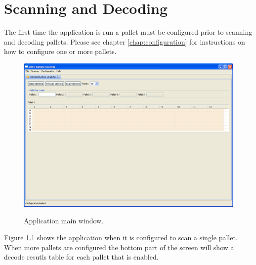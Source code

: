 \chapter{Scanning and Decoding}

The first time the application is run a pallet must be configured prior to
scanning and decoding pallets. Please see chapter \ref{chap:configuration} for
instructions on how to configure one or more pallets.
\begin{figure}[H]
  \centering
  \scalebox{0.35}
	   { \includegraphics*{screenshots/scan_and_decode/main_window} }
	   \caption{Application main window.}
	   \label{fig:main_window_2}
\end{figure}
Figure \ref{fig:main_window_2} shows the application when it is configured to
scan a single pallet. When more pallets are configured the bottom part of the
screen will show a decode resutls table for each pallet that is enabled.


